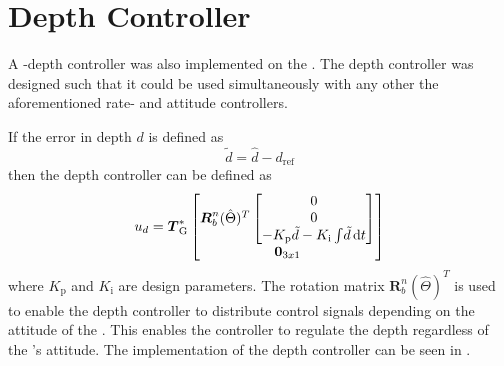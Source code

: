 \section{Depth Controller}  
A \abbrPI-depth controller was also implemented on the \abbrROV. The depth controller was designed such that it could be used simultaneously with any other the aforementioned rate- and attitude controllers. 

If the error in depth $d$ is defined as 
\begin{equation}
\tilde{d} = \hat{d} - d_{\text{ref}}
\end{equation}
then the \abbrPI depth controller can be defined as
\begin{equation}
u_{d} = \thrusterGeometryOnes[*]\begin{bmatrix} \boldsymbol{R}^n_b(\hat{\Theta})^T \begin{bmatrix}
0 \\
0 \\
- K_{\text{p}} \tilde{d} - K_{\text{i}}\int \! \tilde{d} \, \mathrm{d}t
\end{bmatrix} \\ \zeroCol{3}\end{bmatrix}
\end{equation}
where $K_{\text{p}}$ and $K_{\text{i}}$ are design parameters. The rotation matrix $\boldsymbol{R}^n_b(\hat{\Theta})^T$ is used to enable the depth controller to distribute control signals depending on the attitude of the \abbrROV. This enables the controller to regulate the depth regardless of the \abbrROV's attitude. The implementation of the depth controller can be seen in .


